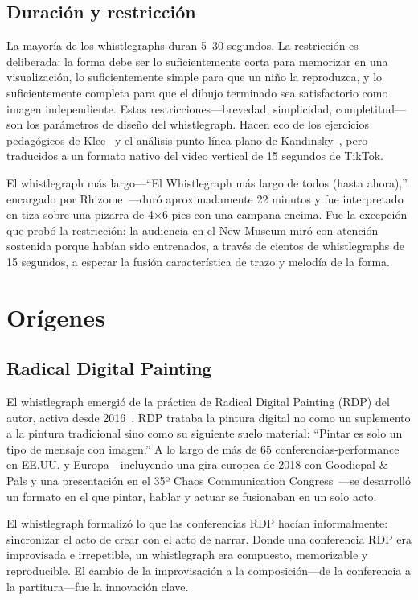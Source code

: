 \documentclass[10pt,letterpaper,twocolumn]{article}
\begin{document}
\subsection{Duración y restricción}

La mayoría de los whistlegraphs duran 5--30 segundos. La restricción es deliberada: la forma debe ser lo suficientemente corta para memorizar en una visualización, lo suficientemente simple para que un niño la reproduzca, y lo suficientemente completa para que el dibujo terminado sea satisfactorio como imagen independiente. Estas restricciones---brevedad, simplicidad, completitud---son los parámetros de diseño del whistlegraph. Hacen eco de los ejercicios pedagógicos de Klee~\citep{klee1925pedagogical} y el análisis punto-línea-plano de Kandinsky~\citep{kandinsky1926point}, pero traducidos a un formato nativo del video vertical de 15 segundos de TikTok.

El whistlegraph más largo---``El Whistlegraph más largo de todos (hasta ahora),'' encargado por Rhizome~\citep{rhizome2022longest}---duró aproximadamente 22 minutos y fue interpretado en tiza sobre una pizarra de 4$\times$6 pies con una campana encima. Fue la excepción que probó la restricción: la audiencia en el New Museum miró con atención sostenida porque habían sido entrenados, a través de cientos de whistlegraphs de 15 segundos, a esperar la fusión característica de trazo y melodía de la forma.

\section{Orígenes}

\subsection{Radical Digital Painting}

El whistlegraph emergió de la práctica de Radical Digital Painting (RDP) del autor, activa desde 2016~\citep{scudder2017manifesto}. RDP trataba la pintura digital no como un suplemento a la pintura tradicional sino como su siguiente suelo material: ``Pintar es solo un tipo de mensaje con imagen.'' A lo largo de más de 65 conferencias-performance en EE.UU. y Europa---incluyendo una gira europea de 2018 con Goodiepal \& Pals y una presentación en el 35º Chaos Communication Congress~\citep{scudder2018rdp35c3}---se desarrolló un formato en el que pintar, hablar y actuar se fusionaban en un solo acto.

El whistlegraph formalizó lo que las conferencias RDP hacían informalmente: sincronizar el acto de crear con el acto de narrar. Donde una conferencia RDP era improvisada e irrepetible, un whistlegraph era compuesto, memorizable y reproducible. El cambio de la improvisación a la composición---de la conferencia a la partitura---fue la innovación clave.
\end{document}
